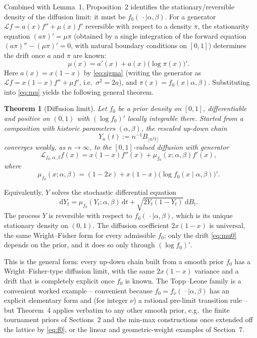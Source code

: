 \documentclass[11pt,reqno]{amsart}
\newtheorem{theorem}{Theorem}[section]
\theoremstyle{definition}
\theoremstyle{remark}
\numberwithin{equation}{section}
\begin{document}
Combined with Lemma~1, Proposition~2 identifies the stationary/reversible density of the diffusion limit: it must be \(f_0(\,\cdot\mid\alpha,\beta)\). For a generator \(\mathcal{L}f=a(x)f''+\mu(x)f'\) reversible with respect to a density \(\pi\), the stationarity equation \((a\pi)'=\mu\pi\) (obtained by a single integration of the forward equation \((a\pi)''-(\mu\pi)'=0\), with natural boundary conditions on \([0,1]\)) determines the drift once \(a\) and \(\pi\) are known:
\begin{equation}\label{eq:mu}
\mu(x)=a'(x)+a(x)\bigl(\log\pi(x)\bigr)'.
\end{equation}
Here \(a(x)=x(1-x)\) by \eqref{eq:sigma} (writing the generator as \(\mathcal{L}f=x(1-x)f''+\mu f'\), i.e.\ \(\sigma^2=2a\)), and \(\pi(x)=f_0(x\mid\alpha,\beta)\). Substituting into \eqref{eq:mu} yields the following general theorem.

\begin{theorem}[Diffusion limit]
Let \(f_0\) be a prior density on \([0,1]\), differentiable and positive on \((0,1)\) with \((\log f_0)'\) locally integrable there. Started from a composition with historic parameters \((\alpha,\beta)\), the rescaled up-down chain
\[
Y_n(t):=n^{-1}B_{\lfloor n^2 t\rfloor}
\]
converges weakly, as \(n\to\infty\), to the \([0,1]\)-valued diffusion with generator
\begin{equation}\label{eq:gen}
\mathcal{L}_{f_0,\alpha,\beta}f(x)=x(1-x)f''(x)+\mu_{f_0}(x;\alpha,\beta)f'(x),
\end{equation}
where
\begin{equation}\label{eq:mu0}
\mu_{f_0}(x;\alpha,\beta)=(1-2x)+x(1-x)\bigl(\log f_0(x\mid\alpha,\beta)\bigr)'.
\end{equation}
\end{theorem}

Equivalently, \(Y\) solves the stochastic differential equation
\begin{equation}\label{eq:SDE}
\mathrm{d}Y_t=\mu_{f_0}(Y_t;\alpha,\beta)\,\mathrm{d}t+\sqrt{2Y_t(1-Y_t)}\,\mathrm{d}B_t.
\end{equation}
The process \(Y\) is reversible with respect to \(f_0(\,\cdot\mid\alpha,\beta)\), which is its unique stationary density on \((0,1)\). The diffusion coefficient \(2x(1-x)\) is universal, the same Wright--Fisher form for every admissible \(f_0\); only the drift \eqref{eq:mu0} depends on the prior, and it does so only through \((\log f_0)'\).

This is the general form: every up-down chain built from a smooth prior \(f_0\) has a Wright--Fisher-type diffusion limit, with the same \(2x(1-x)\) variance and a drift that is completely explicit once \(f_0\) is known. The Topp--Leone family is a convenient worked example -- convenient because \(f_0=f_\nu(\,\cdot\mid\alpha,\beta)\) has an explicit elementary form and (for integer \(\nu\)) a rational pre-limit transition rule -- but Theorem~4 applies verbatim to any other smooth prior, e.g.\ the finite tournament priors of Sections~2 and the min-max constructions once extended off the lattice by \eqref{eq:f0}, or the linear and geometric-weight examples of Section~7.
\end{document}
